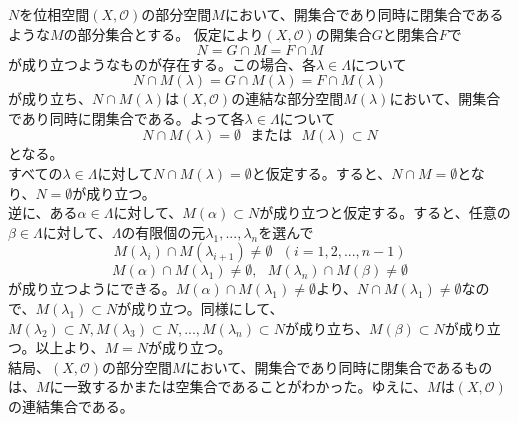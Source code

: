 \documentclass{jsarticle}
\begin{document}
\subsection{}
$N$を位相空間$(X,\mathcal{O})$の部分空間$M$において、開集合であり同時に閉集合であるような$M$の部分集合とする。
仮定により$(X,\mathcal{O})$の開集合$G$と閉集合$F$で
\[N=G\cap M=F\cap M\]
が成り立つようなものが存在する。この場合、各$\lambda\in\Lambda$について
\[N\cap M(\lambda)=G\cap M(\lambda)=F\cap M(\lambda)\]
が成り立ち、$N\cap M(\lambda)$は$(X,\mathcal{O})$の連結な部分空間$M(\lambda)$において、開集合であり同時に閉集合である。よって各$\lambda\in\Lambda$について
\[N\cap M(\lambda)=\emptyset\ \ \ または\ \ \ M(\lambda)\subset N\]
となる。\\
すべての$\lambda\in\Lambda$に対して$N\cap M(\lambda)=\emptyset$と仮定する。すると、$N\cap M=\emptyset$となり、$N=\emptyset$が成り立つ。\\
逆に、ある$\alpha\in\Lambda$に対して、$M(\alpha)\subset N$が成り立つと仮定する。すると、任意の$\beta\in\Lambda$に対して、$\Lambda$の有限個の元$\lambda_1,...,\lambda_n$を選んで
\[M(\lambda_i)\cap M(\lambda_{i+1})\neq\emptyset\ \ \ (i=1,2,...,n-1)\]
\[M(\alpha)\cap M(\lambda_1)\neq\emptyset,\ \ \ M(\lambda_n)\cap M(\beta)\neq\emptyset\]
が成り立つようにできる。$M(\alpha)\cap M(\lambda_1)\neq\emptyset$より、$N\cap M(\lambda_1)\neq\emptyset$なので、$M(\lambda_1)\subset N$が成り立つ。同様にして、$M(\lambda_2)\subset N,M(\lambda_3)\subset N,...,M(\lambda_n)\subset N$が成り立ち、$M(\beta)\subset N$が成り立つ。以上より、$M=N$が成り立つ。\\
結局、$(X,\mathcal{O})$の部分空間$M$において、開集合であり同時に閉集合であるものは、$M$に一致するかまたは空集合であることがわかった。ゆえに、$M$は$(X,\mathcal{O})$の連結集合である。



\end{document}

